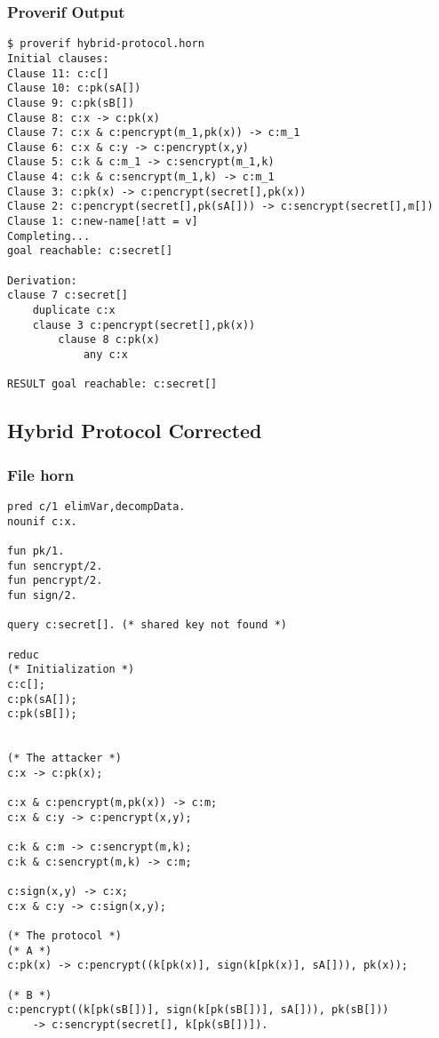 \documentclass[11pt]{article}
\begin{document}
\subsubsection{Proverif Output}
\label{sec:org58bfab4}
\begin{verbatim}
$ proverif hybrid-protocol.horn
Initial clauses:
Clause 11: c:c[]
Clause 10: c:pk(sA[])
Clause 9: c:pk(sB[])
Clause 8: c:x -> c:pk(x)
Clause 7: c:x & c:pencrypt(m_1,pk(x)) -> c:m_1
Clause 6: c:x & c:y -> c:pencrypt(x,y)
Clause 5: c:k & c:m_1 -> c:sencrypt(m_1,k)
Clause 4: c:k & c:sencrypt(m_1,k) -> c:m_1
Clause 3: c:pk(x) -> c:pencrypt(secret[],pk(x))
Clause 2: c:pencrypt(secret[],pk(sA[])) -> c:sencrypt(secret[],m[])
Clause 1: c:new-name[!att = v]
Completing...
goal reachable: c:secret[]

Derivation:
clause 7 c:secret[]
    duplicate c:x
    clause 3 c:pencrypt(secret[],pk(x))
        clause 8 c:pk(x)
            any c:x

RESULT goal reachable: c:secret[]
\end{verbatim}
\subsection{Hybrid Protocol Corrected}
\label{sec:org768e539}
\subsubsection{File horn}
\label{sec:orgaeacb24}
\begin{verbatim}
pred c/1 elimVar,decompData.
nounif c:x.

fun pk/1.
fun sencrypt/2.
fun pencrypt/2.
fun sign/2.

query c:secret[]. (* shared key not found *)

reduc
(* Initialization *)
c:c[];
c:pk(sA[]);
c:pk(sB[]);


(* The attacker *)
c:x -> c:pk(x);

c:x & c:pencrypt(m,pk(x)) -> c:m;
c:x & c:y -> c:pencrypt(x,y);

c:k & c:m -> c:sencrypt(m,k);
c:k & c:sencrypt(m,k) -> c:m;

c:sign(x,y) -> c:x;
c:x & c:y -> c:sign(x,y);

(* The protocol *)
(* A *)
c:pk(x) -> c:pencrypt((k[pk(x)], sign(k[pk(x)], sA[])), pk(x));

(* B *)
c:pencrypt((k[pk(sB[])], sign(k[pk(sB[])], sA[])), pk(sB[]))
    -> c:sencrypt(secret[], k[pk(sB[])]).
\end{verbatim}
\end{document}
